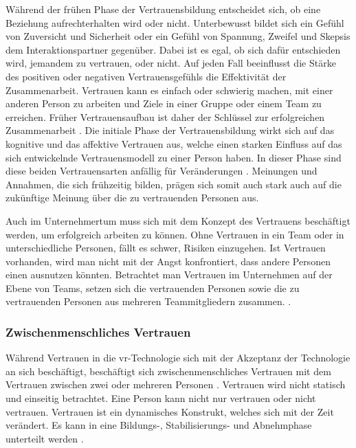 \documentclass[a4paper,11pt]{article}%
\renewcommand{\\}{\vspace*{0.5\baselineskip} \newline}
\begin{document}
Während der frühen Phase der Vertrauensbildung entscheidet sich, ob eine Beziehung aufrechterhalten wird oder nicht. Unterbewusst bildet sich ein Gefühl von Zuversicht und Sicherheit oder ein Gefühl von Spannung, Zweifel und Skepsis dem Interaktionspartner gegenüber. 
Dabei ist es egal, ob sich dafür entschieden wird, jemandem zu vertrauen, oder nicht. Auf jeden Fall beeinflusst die Stärke des positiven oder negativen Vertrauensgefühls die Effektivität der Zusammenarbeit. Vertrauen kann es einfach oder schwierig machen, mit einer anderen Person zu arbeiten und Ziele in einer Gruppe oder einem Team zu erreichen.
Früher Vertrauensaufbau ist daher der Schlüssel zur erfolgreichen Zusammenarbeit \citep[p.405-406]{bigley1998straining}.
Die initiale Phase der Vertrauensbildung wirkt sich auf das kognitive und das affektive Vertrauen aus, welche einen starken Einfluss auf das sich entwickelnde Vertrauensmodell zu einer Person haben. In dieser Phase sind diese beiden Vertrauensarten anfällig für Veränderungen \citep[p.461-462]{baldwin1992relational}.
Meinungen und Annahmen, die sich frühzeitig bilden, prägen sich somit auch stark auch auf die zukünftige Meinung über die zu vertrauenden Personen aus.

Auch im Unternehmertum muss sich mit dem Konzept des Vertrauens beschäftigt werden, um erfolgreich arbeiten zu können. Ohne Vertrauen in ein Team oder in unterschiedliche Personen, fällt es schwer, Risiken einzugehen. Ist Vertrauen vorhanden, wird man nicht mit der Angst konfrontiert, dass andere Personen einen ausnutzen könnten. Betrachtet man Vertrauen im Unternehmen auf der Ebene von Teams, setzen sich die vertrauenden Personen sowie die zu vertrauenden Personen aus mehreren Teammitgliedern zusammen. \citep[p.1152]{breuer2016does}.

 

		\subsubsection{Zwischenmenschliches Vertrauen}
Während Vertrauen in die \ac{vr}-Technologie sich mit der Akzeptanz der Technologie an sich beschäftigt, beschäftigt sich zwischenmenschliches Vertrauen mit dem Vertrauen zwischen zwei oder mehreren Personen \citep{mcknight2011trust}.
Vertrauen wird nicht statisch und einseitig betrachtet. Eine Person kann nicht nur \dq{}vertrauen\dq{} oder \dq{}nicht vertrauen\dq{}. Vertrauen ist ein dynamisches Konstrukt, welches sich mit der Zeit verändert. Es kann in eine Bildungs-, Stabilisierungs- und Abnehmphase unterteilt werden \citep[p.396]{rousseau1998not}.
\end{document}
